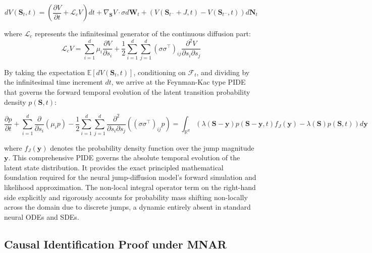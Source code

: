 \begin{equation}
dV(\mathbf{S}_t, t) = \left( \frac{\partial V}{\partial t} + \mathcal{L}_c V \right) dt + \nabla_{\mathbf{S}} V \cdot \sigma d\mathbf{W}_t + \left( V(\mathbf{S}_{t^-} + J, t) - V(\mathbf{S}_{t^-}, t) \right) d\mathbf{N}_t
\end{equation}

where $\mathcal{L}_c$ represents the infinitesimal generator of the continuous diffusion part:
\begin{equation}
\mathcal{L}_c V = \sum_{i=1}^d \mu_i \frac{\partial V}{\partial s_i} + \frac{1}{2} \sum_{i=1}^d \sum_{j=1}^d (\sigma \sigma^\top)_{ij} \frac{\partial^2 V}{\partial s_i \partial s_j}
\end{equation}

By taking the expectation $\mathbb{E}[dV(\mathbf{S}_t, t)]$, conditioning on $\mathcal{F}_t$, and dividing by the infinitesimal time increment $dt$, we arrive at the Feynman-Kac type PIDE that governs the forward temporal evolution of the latent transition probability density $p(\mathbf{S}, t)$:

\begin{equation}
\frac{\partial p}{\partial t} + \sum_{i=1}^d \frac{\partial}{\partial s_i} (\mu_i p) - \frac{1}{2} \sum_{i=1}^d \sum_{j=1}^d \frac{\partial^2}{\partial s_i \partial s_j} \left( (\sigma \sigma^\top)_{ij} p \right) = \int_{\mathbb{R}^d} \left( \lambda(\mathbf{S}-\mathbf{y}) p(\mathbf{S}-\mathbf{y}, t) f_J(\mathbf{y}) - \lambda(\mathbf{S}) p(\mathbf{S}, t) \right) d\mathbf{y}
\end{equation}

where $f_J(\mathbf{y})$ denotes the probability density function over the jump magnitude $\mathbf{y}$. This comprehensive PIDE governs the absolute temporal evolution of the latent state distribution. It provides the exact principled mathematical foundation required for the neural jump-diffusion model's forward simulation and likelihood approximation. The non-local integral operator term on the right-hand side explicitly and rigorously accounts for probability mass shifting non-locally across the domain due to discrete jumps, a dynamic entirely absent in standard neural ODEs and SDEs.

\subsection{Causal Identification Proof under MNAR}

